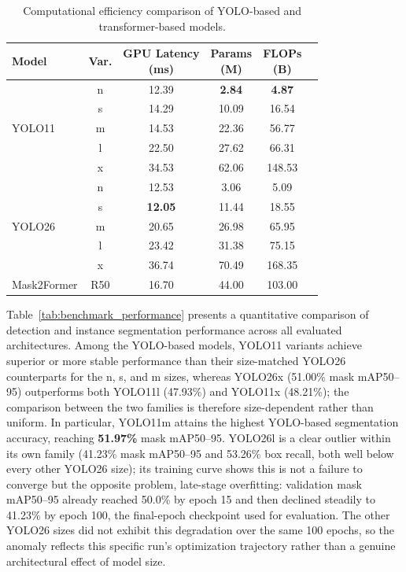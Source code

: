 \documentclass[runningheads]{llncs}
\begin{document}
\begin{table}[t]
\centering
\caption{Computational efficiency comparison of YOLO-based and transformer-based models.}
\label{tab:benchmark_efficiency}
\setlength{\tabcolsep}{4pt}
\renewcommand{\arraystretch}{1.05}
\small
\begin{tabular}{lccccc}
\hline
Model & Var. & \makecell{GPU Latency\\(ms)} & \makecell{Params\\(M)} & \makecell{FLOPs\\(B)} \\
\hline

\multirow{5}{*}{YOLO11} 
& n & 12.39 & \textbf{2.84} & \textbf{4.87} \\
& s & 14.29 & 10.09 & 16.54 \\
& m & 14.53 & 22.36 & 56.77 \\
& l & 22.50 & 27.62 & 66.31 \\
& x & 34.53 & 62.06 & 148.53 \\

\hline

\multirow{5}{*}{YOLO26} 
& n & 12.53 & 3.06 & 5.09 \\
& s & \textbf{12.05} & 11.44 & 18.55 \\
& m & 20.65 & 26.98 & 65.95 \\
& l & 23.42 & 31.38 & 75.15 \\
& x & 36.74 & 70.49 & 168.35 \\

\hline

Mask2Former & R50 & 16.70 & 44.00 & 103.00 \\

\hline
\end{tabular}
\end{table}

Table~\ref{tab:benchmark_performance} presents a quantitative comparison of
detection and instance segmentation performance across all evaluated
architectures. Among the YOLO-based models, YOLO11 variants achieve superior
or more stable performance than their size-matched YOLO26 counterparts for
the n, s, and m sizes, whereas YOLO26x (51.00\% mask mAP50--95) outperforms
both YOLO11l (47.93\%) and YOLO11x (48.21\%); the comparison between the two
families is therefore size-dependent rather than uniform. In particular,
YOLO11m attains the highest YOLO-based segmentation accuracy, reaching
\textbf{51.97\%} mask mAP50--95. YOLO26l is a clear outlier within its own
family (41.23\% mask mAP50--95 and 53.26\% box recall, both well below every
other YOLO26 size); its training curve shows this is not a failure to
converge but the opposite problem, late-stage overfitting: validation mask
mAP50--95 already reached 50.0\% by epoch 15 and then declined steadily to
41.23\% by epoch 100, the final-epoch checkpoint used for evaluation. The
other YOLO26 sizes did not exhibit this degradation over the same 100
epochs, so the anomaly reflects this specific run's optimization trajectory
rather than a genuine architectural effect of model size.
\end{document}
